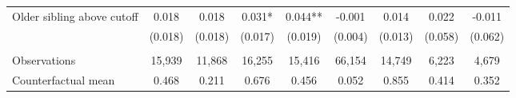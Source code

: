 {{\begin{tabular}{lcccccccc}
Older sibling above cutoff&       0.018   &       0.018   &       0.031*  &       0.044** &      -0.001   &       0.014   &       0.022   &      -0.011   \\
                    &     (0.018)   &     (0.018)   &     (0.017)   &     (0.019)   &     (0.004)   &     (0.013)   &     (0.058)   &     (0.062)   \\
                    &               &               &               &               &               &               &               &               \\
Observations        &      15,939   &      11,868   &      16,255   &      15,416   &      66,154   &      14,749   &       6,223   &       4,679   \\
Counterfactual mean &       0.468   &       0.211   &       0.676   &       0.456   &       0.052   &       0.855   &       0.414   &       0.352   \\
 

\bottomrule
\end{tabular}
}
}
